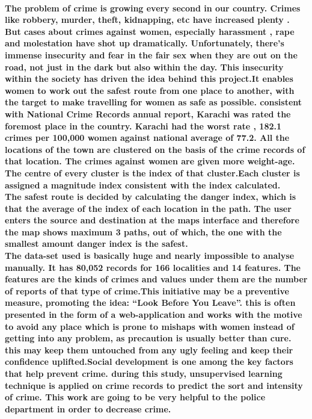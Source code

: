 \documentclass[12 pt,letterpaper]{article}
\begin{document}
\paragraph{The problem of crime is growing every second in our country. Crimes like robbery, murder, theft, kidnapping, etc have increased plenty . But cases about crimes against women, especially harassment , rape and molestation have shot up dramatically. Unfortunately, there’s immense insecurity and fear in the fair sex when they are out on the road, not just in the dark but also within the day. This insecurity within the society has driven the idea behind this project.It enables women to work out the safest route from one place to another, with the target to make travelling for women as safe as possible. consistent with National Crime Records annual report, Karachi was rated the foremost place
in the country. Karachi had the worst rate , 182.1 crimes per 100,000 women against national average of 77.2. All the locations of the town are clustered on the basis of the crime records of that location. The crimes against women are given more weight-age. The centre of every cluster is the index of that cluster.Each cluster is assigned a magnitude index consistent with the index calculated.\\
The safest route is decided by calculating the danger index, which is that the average of the index of each location in the path. The user enters the source and destination at the maps interface and therefore the map shows maximum 3 paths, out of which, the one with the smallest amount danger index is the safest.\\
The data-set used is basically huge and nearly impossible to analyse manually. It has 80,052 records for 166 localities and 14 features. The features are the kinds of crimes and values under them are the number of reports of that type of crime.This initiative may be a preventive measure, promoting the idea: “Look Before You Leave”. this is often presented in the form of a web-application and works with the motive to avoid any place which is prone to mishaps with
women instead of getting into any problem, as precaution is usually better than cure. this may keep them untouched from any ugly feeling and keep their confidence uplifted.Social development is one among the key factors that help prevent crime. during this study, unsupervised learning technique is applied on crime records to predict the sort and intensity of crime. This work are going to
be very helpful to the police department in order to decrease crime.}
\end{document}
